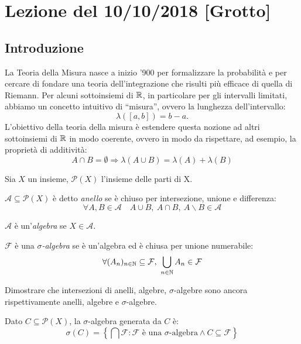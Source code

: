 \section{Lezione del 10/10/2018 [Grotto]}
\subsection{Introduzione}
La Teoria della Misura nasce a inizio '900 per formalizzare la probabilità e per cercare di fondare una teoria dell'integrazione che risulti più efficace di quella di Riemann. Per alcuni sottoinsiemi di $\mathbb{R}$, in particolare per gli intervalli limitati, abbiamo un concetto intuitivo di ``misura'', ovvero la lunghezza dell'intervallo:
\[ \lambda\left([a,b]\right) = b-a. \]
L'obiettivo della teoria della misura è estendere questa nozione ad altri sottoinsiemi di $\mathbb{R}$ in modo coerente, ovvero in modo da rispettare, ad esempio, la proprietà di additività:
\[ A \cap B = \emptyset \Rightarrow \lambda(A\cup B) = \lambda(A) + \lambda(B) \]

Sia $X$ un insieme, $\mathscr{P}(X)$ l'insieme delle parti di X.

\begin{definition}
	$\mathcal{A} \subseteq \mathscr{P}(X)$ è detto \emph{anello} se è chiuso per intersezione, unione e differenza:
	\[ \forall A, B \in \mathcal A \quad A\cup B,\ A\cap B,\ A\smallsetminus B \in \mathcal{A} \]
\end{definition}

\begin{definition}
	$\mathcal{A}$ è un'\emph{algebra} se $X\in \mathcal{A}$.
\end{definition}

\begin{definition}
	$\mathcal{F} $ è una \emph{$\sigma$-algebra} se è un'algebra ed è chiusa per unione numerabile:
	\[ \forall (A_n)_{n\in\N}\subseteq \mathcal{F},\ \bigcup_{n\in \N} A_n \in \mathcal{F} \]
\end{definition}

\begin{exercise}
	Dimostrare che intersezioni di anelli, algebre, $\sigma$-algebre sono ancora rispettivamente anelli, algebre e $\sigma$-algebre.
\end{exercise}

\begin{definition}
	Dato $C\subseteq \mathscr{P}(X)$, la $\sigma$-algebra generata da $C$ è:
	\[ \sigma(C)= \left\{\bigcap \mathcal{F}: \mathcal{F} \text{ è una $\sigma$-algebra} \wedge C\subseteq \mathcal{F} \right\} \]
\end{definition}

